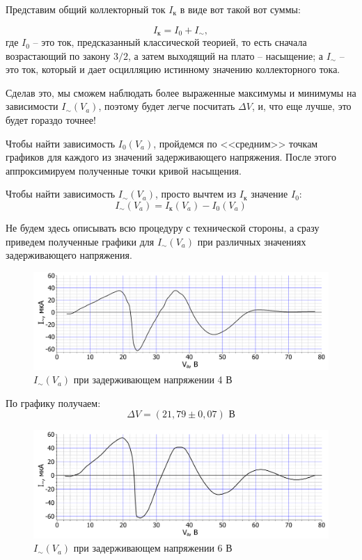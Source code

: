 Представим общий коллекторный ток $I_\text{к}$ в виде вот такой вот суммы:

\begin{equation*}
	I_\text{к} = I_0 + I_\sim,
\end{equation*}
где $I_0$ -- это ток, предсказанный классической теорией, то есть сначала возрастающий по закону $3/2$, а затем выходящий на плато -- насыщение; а $I_\sim$ -- это ток, который и дает осцилляцию истинному значению коллекторного тока.

Сделав это, мы сможем наблюдать более выраженные максимумы и минимумы на зависимости $I_\sim (V_a)$, поэтому будет легче посчитать $\Delta V$, и, что еще лучше, это будет гораздо точнее! 

Чтобы найти зависимость $I_0(V_a)$, пройдемся по <<средним>> точкам графиков для каждого из значений задерживающего напряжения. После этого аппроксимируем полученные точки кривой насыщения.

Чтобы найти зависимость $I_\sim (V_a)$, просто вычтем из $I_\text{к}$ значение $I_0$:
\begin{equation*}
	I_\sim (V_a) = I_\text{к}(V_a) - I_0 (V_a)
\end{equation*}

Не будем здесь описывать всю процедуру с технической стороны, а сразу приведем полученные графики для $I_\sim (V_a)$ при различных значениях задерживающего напряжения.


\begin{figure}[h!]
	\centering
	\includegraphics[width=\linewidth]{./Pictures/I_tilde(V)_4V.pdf}
	\caption{$I_\sim (V_a)$ при задерживающем напряжении 4 В}
\end{figure}

По графику получаем:
\begin{equation*}
	\Delta V = (21,79 \pm 0,07) \text{ В}
\end{equation*}


\newpage
\begin{figure}[h!]
	\centering
	\includegraphics[width=\linewidth]{./Pictures/I_tilde(V)_6V.pdf}
	\caption{$I_\sim (V_a)$ при задерживающем напряжении 6 В}
\end{figure}

